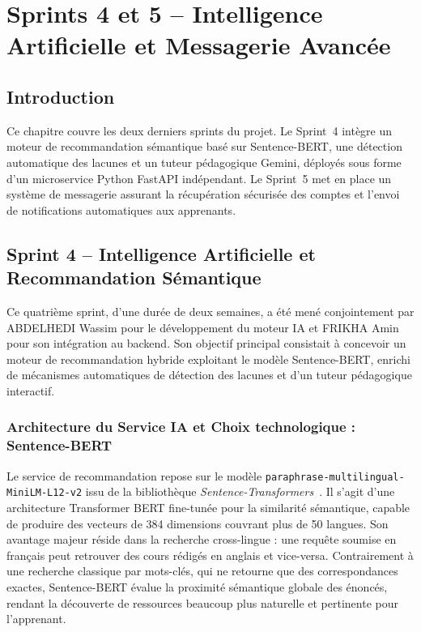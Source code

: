 \documentclass[12pt,a4paper]{report}
\begin{document}

\chapter{Sprints 4 et 5 -- Intelligence Artificielle et Messagerie Avancée}

\section*{Introduction}

Ce chapitre couvre les deux derniers sprints du projet. Le Sprint~4 intègre un moteur de recommandation sémantique basé sur Sentence-BERT, une détection automatique des lacunes et un tuteur pédagogique Gemini, déployés sous forme d'un microservice Python FastAPI indépendant. Le Sprint~5 met en place un système de messagerie assurant la récupération sécurisée des comptes et l'envoi de notifications automatiques aux apprenants.


\section{Sprint 4 -- Intelligence Artificielle et Recommandation Sémantique}

Ce quatrième sprint, d'une durée de deux semaines, a été mené conjointement par ABDELHEDI Wassim pour le développement du moteur IA et FRIKHA Amin pour son intégration au backend. Son objectif principal consistait à concevoir un moteur de recommandation hybride exploitant le modèle Sentence-BERT, enrichi de mécanismes automatiques de détection des lacunes et d'un tuteur pédagogique interactif.

\subsection{Architecture du Service IA et Choix technologique : Sentence-BERT}

Le service de recommandation repose sur le modèle \texttt{paraphrase-multilingual-MiniLM-L12-v2} issu de la bibliothèque \textit{Sentence-Transformers}~\cite{sbert}. Il s'agit d'une architecture Transformer BERT fine-tunée pour la similarité sémantique, capable de produire des vecteurs de 384 dimensions couvrant plus de 50 langues. Son avantage majeur réside dans la recherche cross-lingue : une requête soumise en français peut retrouver des cours rédigés en anglais et vice-versa. Contrairement à une recherche classique par mots-clés, qui ne retourne que des correspondances exactes, Sentence-BERT évalue la proximité sémantique globale des énoncés, rendant la découverte de ressources beaucoup plus naturelle et pertinente pour l'apprenant.
\end{document}
